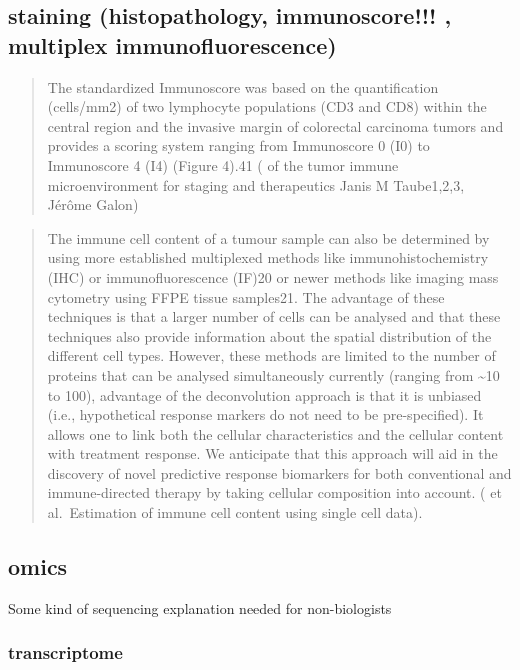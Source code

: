 \documentclass[12pt,]{book}
\theoremstyle{definition}
\theoremstyle{definition}
\theoremstyle{definition}
\theoremstyle{remark}
\begin{document}
\hypertarget{staining}{%
\subsection{staining (histopathology, immunoscore!!! , multiplex
immunofluorescence)}\label{staining}}

\begin{quote}
The standardized Immunoscore was based on the quantification (cells/mm2)
of two lymphocyte populations (CD3 and CD8) within the central region
and the invasive margin of colorectal carcinoma tumors and provides a
scoring system ranging from Immunoscore 0 (I0) to Immunoscore 4 (I4)
(Figure 4).41 (\citet{Implications} of the tumor immune microenvironment
for staging and therapeutics Janis M Taube1,2,3, Jérôme Galon)
\end{quote}

\begin{quote}
The immune cell content of a tumour sample can also be determined by
using more established multiplexed methods like immunohistochemistry
(IHC) or immunofluorescence (IF)20 or newer methods like imaging mass
cytometry using FFPE tissue samples21. The advantage of these techniques
is that a larger number of cells can be analysed and that these
techniques also provide information about the spatial distribution of
the different cell types. However, these methods are limited to the
number of proteins that can be analysed simultaneously currently
(ranging from \textasciitilde{}10 to 100), advantage of the
deconvolution approach is that it is unbiased (i.e., hypothetical
response markers do not need to be pre-specified). It allows one to link
both the cellular characteristics and the cellular content with
treatment response. We anticipate that this approach will aid in the
discovery of novel predictive response biomarkers for both conventional
and immune-directed therapy by taking cellular composition into account.
(\citet{Shelker} et al.~Estimation of immune cell content using single
cell data).
\end{quote}

\hypertarget{omics}{%
\subsection{omics}\label{omics}}

Some kind of sequencing explanation needed for non-biologists

\hypertarget{transcriptome}{%
\subsubsection{transcriptome}\label{transcriptome}}
\end{document}
